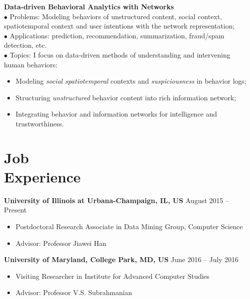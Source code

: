 \documentclass[margin, 10pt]{res}
\begin{document}
\begin{resume}
\textbf{Data-driven Behavioral Analytics with Networks} \\
$\bullet$ {Problems:} Modeling behaviors of unstructured content, social context, spatiotemporal context and user intentions with the network representation; \\
$\bullet$ {Applications:} prediction, recommendation, summarization, fraud/spam detection, etc. \\
$\bullet$ {Topics:} I focus on data-driven methods of understanding and intervening human behaviors:
\begin{itemize} \itemsep -2pt
	\item Modeling \emph{social spatiotemporal} contexts and \emph{suspiciousness} in behavior logs;
	\item Structuring \emph{unstructured} behavior content into rich information network;
	\item Integrating behavior and information networks for intelligence and trustworthiness.
\end{itemize}


\section{Job \\ Experience}

\textbf{University of Illinois at Urbana-Champaign, IL, US} \hfill{August 2015 -- Present}
\begin{itemize} \itemsep -2pt
	\item Postdoctoral Research Associate in Data Mining Group, Computer Science
	\item Advisor: Professor Jiawei Han
\end{itemize}

\textbf{University of Maryland, College Park, MD, US} \hfill{June 2016 -- July 2016}
\begin{itemize} \itemsep -2pt
	\item Visiting Researcher in Institute for Advanced Computer Studies
	\item Advisor: Professor V.S. Subrahmanian
\end{itemize}



\end{resume}
\end{document}
